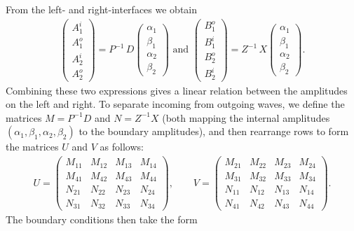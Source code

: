 \documentclass[aps,prb,onecolumn,longbibliography,nofootinbib,citeautoscript,10pt]{revtex4-2}
\begin{document}
From the left- and right-interfaces we obtain
\begin{align}
\begin{pmatrix}
A_1^i\\
A_1^o\\
A_2^i\\
A_2^o
\end{pmatrix}
=P^{-1}\,D
\begin{pmatrix}
\alpha_1\\
\beta_1\\
\alpha_2\\
\beta_2
\end{pmatrix} \text{ and }
\begin{pmatrix}
B_1^o\\
B_1^i\\
B_2^o\\
B_2^i
\end{pmatrix}=Z^{-1}\,X
\begin{pmatrix}
\alpha_1\\
\beta_1\\
\alpha_2\\
\beta_2
\end{pmatrix}.
\end{align}
Combining these two expressions gives a linear relation between the amplitudes on the left and right. To separate incoming from outgoing waves, we define the matrices $M=P^{-1}D$ and $N=Z^{-1}X$ (both mapping the internal amplitudes $(\alpha_1,\beta_1,\alpha_2,\beta_2)$ to the boundary amplitudes), and then rearrange rows to form the matrices $U$ and $V$ as follows:
\begin{align}
U=
\begin{pmatrix}
M_{11}&M_{12}&M_{13}&M_{14}\\
M_{41}&M_{42}&M_{43}&M_{44}\\
N_{21}&N_{22}&N_{23}&N_{24}\\
N_{31}&N_{32}&N_{33}&N_{34}
\end{pmatrix} , 
\qquad
V=
\begin{pmatrix}
M_{21}&M_{22}&M_{23}&M_{24}\\
M_{31}&M_{32}&M_{33}&M_{34}\\
N_{11}&N_{12}&N_{13}&N_{14}\\
N_{41}&N_{42}&N_{43}&N_{44}
\end{pmatrix}.
\end{align}
The boundary conditions then take the form
\end{document}
